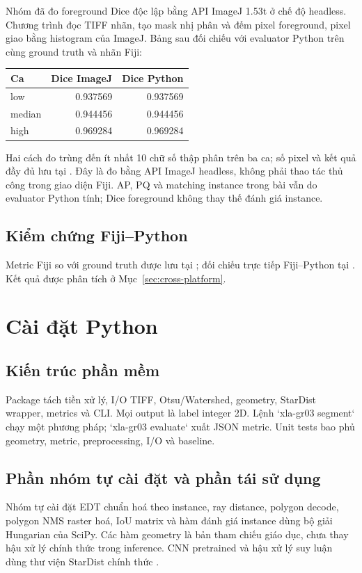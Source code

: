 \documentclass[12pt,a4paper]{report}
\begin{document}
Nhóm đã đo foreground Dice độc lập bằng API ImageJ 1.53t ở chế độ headless.
Chương trình  đọc TIFF nhãn, tạo mask
nhị phân và đếm pixel foreground, pixel giao bằng histogram của ImageJ. Bảng
sau đối chiếu với evaluator Python trên cùng ground truth và nhãn Fiji:
\begin{center}
\begin{tabular}{lrr}\toprule
Ca & Dice ImageJ & Dice Python\\\midrule
low & 0.937569 & 0.937569\\
median & 0.944456 & 0.944456\\
high & 0.969284 & 0.969284\\\bottomrule
\end{tabular}
\end{center}
Hai cách đo trùng đến ít nhất 10 chữ số thập phân trên ba ca; số pixel và
kết quả đầy đủ lưu tại . Đây là
đo bằng API ImageJ headless, không phải thao tác thủ công trong giao diện Fiji.
AP, PQ và matching instance trong bài vẫn do evaluator Python tính; Dice
foreground không thay thế đánh giá instance.

\section{Kiểm chứng Fiji--Python}
Metric Fiji so với ground truth được lưu tại ;
đối chiếu trực tiếp Fiji--Python tại .
Kết quả được phân tích ở Mục~\ref{sec:cross-platform}.

\chapter{Cài đặt Python}
\section{Kiến trúc phần mềm}
Package  tách tiền xử lý, I/O TIFF, Otsu/Watershed, geometry,
StarDist wrapper, metrics và CLI. Mọi output là label integer 2D. Lệnh
`xla-gr03 segment` chạy một phương pháp; `xla-gr03 evaluate` xuất JSON metric.
Unit tests bao phủ geometry, metric, preprocessing, I/O và baseline.

\section{Phần nhóm tự cài đặt và phần tái sử dụng}
Nhóm tự cài đặt EDT chuẩn hoá theo instance, ray distance, polygon decode,
polygon NMS raster hoá, IoU matrix và hàm đánh giá instance dùng bộ giải Hungarian của SciPy. Các hàm geometry là bản tham chiếu giáo dục, chưa thay hậu xử lý chính thức trong inference. CNN pretrained và hậu xử lý suy luận dùng thư viện StarDist chính thức
\citep{stardist_repository}.
\end{document}
